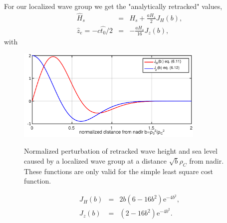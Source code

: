 For our localized wave group we get the "analytically retracked" values, 
 \begin{eqnarray}
    \widehat{H}_{s}&=& H_s +  \frac{a H_s }{2}  J_H(b), \label{eq:Hsfit}\\
    \widehat{z}_e= - c \widehat{t_0} / 2 & =& - \frac{a H_s}{16} J_z(b),\label{eq:epochfit}
\end{eqnarray}
with 
\begin{figure}[h!]
\centerline{\includegraphics[width=0.8\textwidth]{FIGS_CH_SAT/FigA3_Jfunc.pdf}}
  \caption{Normalized perturbation of retracked wave height and sea level caused by a localized wave group at a distance $\sqrt{b} \rho_C$ from nadir. These functions are only valid for the simple least square cost function.}{} \label{fig:alti_JLS}
\end{figure}
 \begin{eqnarray}
    J_H(b)&=& 2 b \left(6- 16 b^2\right) \mathrm{e}^{-4b^2},\label{eq:JH}\\
    J_z(b)&=&   \left(2-16 b^2\right) \mathrm{e}^{-4 b^2}.\label{eq:Jz}
\end{eqnarray}

